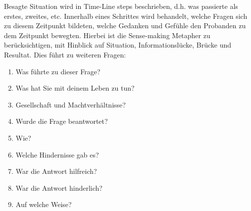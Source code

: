 Besagte Situation wird in Time-Line steps beschrieben, d.h. was passierte als erstes, zweites, etc. Innerhalb eines Schrittes wird behandelt, welche Fragen sich zu diesem Zeitpunkt bildeten, welche Gedanken und Gef\"uhle den Probanden zu dem Zeitpunkt bewegten.\newline
Hierbei ist die Sense-making Metapher zu ber\"ucksichtigen, mit Hinblick auf Situation, Informationsl\"ucke, Br\"ucke und Resultat.\cite{dervin2003sense}\newline
Dies f\"uhrt zu weiteren Fragen:\newline
\begin{enumerate}
    \item Was f\"uhrte zu dieser Frage?
    \item Was hat Sie mit deinem Leben zu tun?
    \item Gesellschaft und Machtverh\"altnisse?
    \item Wurde die Frage beantwortet?
    \item Wie?
    \item Welche Hindernisse gab es?
    \item War die Antwort hilfreich?
    \item War die Antwort hinderlich?
    \item Auf welche Weise?
\end{enumerate}